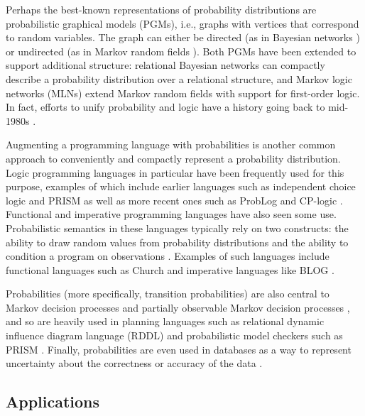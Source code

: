 \documentclass{article}
\begin{document}
Perhaps the best-known representations of probability distributions are
probabilistic graphical models (PGMs), i.e., graphs with vertices that
correspond to random variables. The graph can either be directed (as in Bayesian
networks \cite{DBLP:books/daglib/0066829}) or undirected (as in Markov random
fields \cite{spitzer1971markov}). Both PGMs have been extended to support
additional structure: relational Bayesian networks \cite{DBLP:conf/uai/Jaeger97}
can compactly describe a probability distribution over a relational structure,
and Markov logic networks (MLNs) \cite{DBLP:journals/ml/RichardsonD06} extend
Markov random fields with support for first-order logic. In fact, efforts to
unify probability and logic have a history going back to mid-1980s
\cite{DBLP:journals/ndjfl/Hailperin84,DBLP:journals/ai/Nilsson86}.

Augmenting a programming language with probabilities is another common approach
to conveniently and compactly represent a probability distribution. Logic
programming languages in particular have been frequently used for this purpose,
examples of which include earlier languages such as independent choice logic
\cite{DBLP:journals/ai/Poole97} and PRISM \cite{DBLP:conf/ijcai/SatoK97} as well
as more recent ones such as ProbLog \cite{DBLP:conf/ijcai/RaedtKT07} and
CP-logic \cite{DBLP:journals/tplp/VennekensDB09}. Functional and imperative
programming languages have also seen some use. Probabilistic semantics in these
languages typically rely on two constructs: the ability to draw random values
from probability distributions and the ability to condition a program on
observations \cite{DBLP:conf/icse/GordonHNR14}. Examples of such languages
include functional languages such as Church \cite{DBLP:conf/uai/GoodmanMRBT08}
and imperative languages like BLOG \cite{DBLP:conf/ijcai/MilchMRSOK05}.

Probabilities (more specifically, transition probabilities) are also central to
Markov decision processes \cite{bellman1957markovian} and partially observable
Markov decision processes \cite{aastrom1965optimal}, and so are heavily used in
planning languages such as relational dynamic influence diagram language (RDDL)
\cite{sanner2010relational} and probabilistic model checkers such as PRISM
\cite{DBLP:conf/cav/KwiatkowskaNP11}. Finally, probabilities are even used in
databases as a way to represent uncertainty about the correctness or accuracy of
the data \cite{DBLP:series/synthesis/2011Suciu}.

\subsection{Applications}
\end{document}

